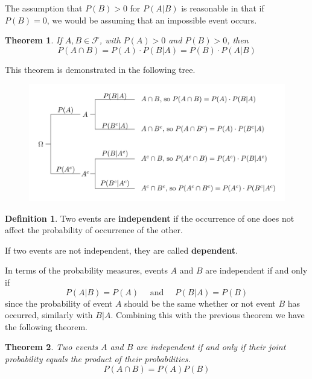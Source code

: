 \documentclass[
]{book}
\newtheorem{theorem}{Theorem}[chapter]
\theoremstyle{definition}
\newtheorem{definition}{Definition}[chapter]
\theoremstyle{definition}
\theoremstyle{definition}
\theoremstyle{definition}
\theoremstyle{remark}
\begin{document}
The assumption that \(P(B)>0\) for \(P(A\vert B)\) is reasonable in that if \(P(B)=0\), we would be assuming that an impossible event occurs.

\begin{theorem}
\protect\hypertarget{thm:probability-intersection}{}\label{thm:probability-intersection}If \(A,B\in \mathcal{F}\), with \(P(A)>0\) and \(P(B)>0\), then
\[P(A\cap B) = P(A)\cdot P(B\vert A) = P(B) \cdot P(A\vert B)\]
\end{theorem}

This theorem is demonstrated in the following tree.

\begin{figure}

{\centering \includegraphics[width=0.8\linewidth]{tikz/conditional-tree} 

}

\end{figure}

\begin{definition}
Two events are \textbf{independent} if the occurrence of one does not affect the probability of occurrence of the other.

If two events are not independent, they are called \textbf{dependent}.
\end{definition}

In terms of the probability measures, events \(A\) and \(B\) are independent if and only if
\[P(A|B) = P(A) \quad \mbox{ and } \quad P(B|A) = P(B)\] since the probability of event \(A\) should be the same whether or not event \(B\) has occurred, similarly with \(B|A\). Combining this with the previous theorem we have the following theorem.

\begin{theorem}
Two events \(A\) and \(B\) are independent if and only if their joint probability equals the product of their probabilities.
\[P(A \cap B) = P(A)P(B)\]
\end{theorem}
\end{document}
